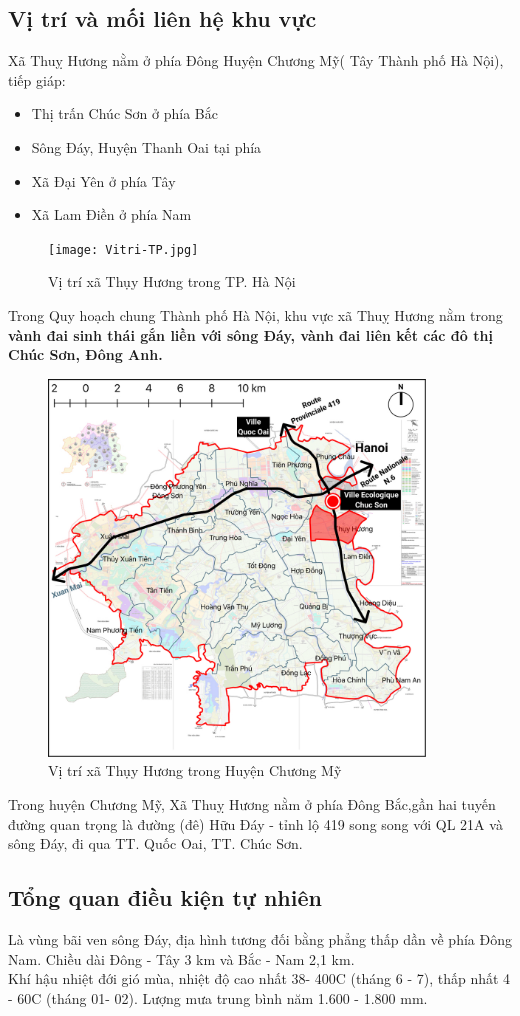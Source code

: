 \documentclass[../thesis.tex]{subfiles}
\begin{document}
\subsection {Vị trí và mối liên hệ khu vực}
Xã Thuỵ Hương nằm ở phía Đông Huyện Chương Mỹ( Tây Thành phố Hà Nội), tiếp giáp:
\begin{itemize}
    \item Thị trấn Chúc Sơn ở phía Bắc
    \item Sông Đáy, Huyện Thanh Oai tại phía
    \item Xã Đại Yên ở phía Tây
    \item Xã Lam Điền ở phía Nam 
\end{itemize}
\begin{figure}[ht!]\texttt{[image: Vitri-TP.jpg]}\caption{Vị trí xã Thụy Hương trong TP. Hà Nội}\end{figure}
Trong Quy hoạch chung Thành phố Hà Nội, khu vực xã Thuỵ Hương nằm trong\textbf{ vành đai sinh thái gắn liền với sông Đáy, vành đai liên kết các đô thị Chúc Sơn, Đông Anh.}
\begin{figure}[ht!]\includegraphics[width=10cm]{Graphic/Vitri-Huyen.jpg}\caption{Vị trí xã Thụy Hương trong Huyện Chương Mỹ}\end{figure}
Trong huyện Chương Mỹ, Xã Thuỵ Hương nằm ở phía Đông Bắc,gần hai tuyến đường quan trọng là đường (đê) Hữu Đáy - tỉnh lộ 419 song song với QL 21A và sông Đáy, đi qua TT. Quốc Oai, TT. Chúc Sơn.

\subsection {Tổng quan điều kiện tự nhiên}
Là vùng bãi ven sông Đáy, địa hình tương đối bằng phẳng thấp dần về phía Đông Nam. Chiều dài Đông - Tây 3 km và Bắc - Nam 2,1 km.\\
Khí hậu nhiệt đới gió mùa, nhiệt độ cao nhất 38- 400C (tháng 6 - 7), thấp nhất 4 - 60C (tháng 01- 02). Lượng mưa trung bình năm 1.600 - 1.800 mm.
\end{document}
